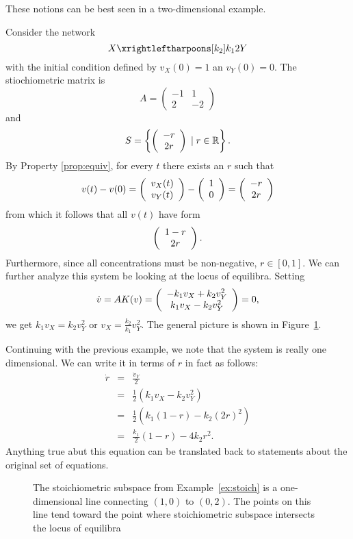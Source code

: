 These notions can be best seen in a two-dimensional example.

\begin{example} \label{ex:stoich}
Consider the network
%
$$
X \xrightleftharpoons[\text{$k_2$}]{\text{$k_1$}} 2 Y 
$$
%
with the initial condition defined by $v_X(0)=1$ an $v_Y(0)=0$. The
stiochiometric matrix is
%
$$
A = \left ( \begin{array}{cc}
-1 & 1 \\
2 & -2
\end{array} \right )
$$
%
and
$$
S = \left \{ \left ( \begin{array}{c} -r \\ 2r \end{array} \right ) \;|\; r \in \mathbb{R} \right \}. 
$$
By Property \ref{prop:equiv}, for every $t$ there exists an $r$ such that
%
$$
v(t) - v(0) = \left ( \begin{array}{c} v_X(t) \\ v_Y(t) \end{array} \right ) - \left ( \begin{array}{c} 1 \\ 0 \end{array} \right ) = \left ( \begin{array}{c} -r \\ 2r \end{array} \right )
$$
%
from which it follows that all $v(t)$ have form
%
$$
\left ( \begin{array}{c} 1-r \\ 2r \end{array} \right ) .
$$
%
Furthermore, since all concentrations must be non-negative, $r \in
[0,1]$. We can further analyze this system be looking at the locus of
equilibra. Setting
$$
\dot v = A K(v) = \left ( \begin{array}{c} -k_1 v_X + k_2 v_Y^2 \\ k_1 v_X - k_2 v_Y^2 \end{array} \right ) = 0,
$$
we get $k_1 v_X = k_2 v_Y^2$ or $v_X = \frac{k_2}{k_1} v_Y^2$. The
general picture is shown in Figure~\ref{fig:stoich}. 
\end{example}

\begin{example}
  Continuing with the previous example, we note that the system is
  really one dimensional. We can write it in terms of $r$ in fact as
  follows:
%
\begin{eqnarray*}
\dot r & = & \frac{\dot v_Y}{2} \\
       & = & \frac{1}{2} \left ( k_1 v_X - k_2 v_Y^2 \right ) \\
       & = & \frac{1}{2} \left ( k_1 (1-r) - k_2 (2r)^2 \right ) \\
       & = & \frac{k_1}{2}(1-r) - 4 k_2 r^2 .
\end{eqnarray*}
%
Anything true abut this equation can be translated back to statements
about the original set of equations. \enx
\end{example}

\begin{figure}


  \caption{\label{fig:stoich} The stoichiometric subspace from
    Example~\ref{ex:stoich} is a one-dimensional line connecting
    $(1,0)$ to $(0,2)$. The points on this line tend toward the point
    where stoichiometric subspace intersects the locus of equilibra}

\end{figure}

